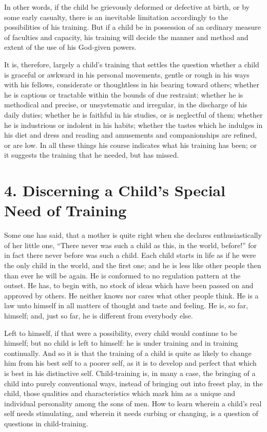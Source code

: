 \documentclass[
]{book}
\begin{document}
In other words, if the child be grievously deformed or defective at birth, or by some early casualty, there is an inevitable limitation accordingly to the possibilities of his training. But if a child be in possession of an ordinary measure of faculties and capacity, his training will decide the manner and method and extent of the use of his God-given powers.

It is, therefore, largely a child's training that settles the question whether a child is graceful or awkward in his personal movements, gentle or rough in his ways with his fellows, considerate or thoughtless in his bearing toward others; whether he is captious or tractable within the bounds of due restraint; whether he is methodical and precise, or unsystematic and irregular, in the discharge of his daily duties; whether he is faithful in his studies, or is neglectful of them; whether he is industrious or indolent in his habits; whether the tastes which he indulges in his diet and dress and reading and amusements and companionships are refined, or are low. In all these things his course indicates what his training has been; or it suggests the training that he needed, but has missed.

\hypertarget{discerning-a-childs-special-need-of-training}{%
\chapter{4. Discerning a Child's Special Need of Training}\label{discerning-a-childs-special-need-of-training}}

Some one has said, that a mother is quite right when she declares enthusiastically of her little one, ``There never was such a child as this, in the world, before!'' for in fact there never before was such a child. Each child starts in life as if he were the only child in the world, and the first one; and he is less like other people then than ever he will be again. He is conformed to no regulation pattern at the outset. He has, to begin with, no stock of ideas which have been passed on and approved by others. He neither knows nor cares what other people think. He is a law unto himself in all matters of thought and taste and feeling. He is, so far, himself; and, just so far, he is different from everybody else.

Left to himself, if that were a possibility, every child would continue to be himself; but no child is left to himself: he is under training and in training continually. And so it is that the training of a child is quite as likely to change him from his best self to a poorer self, as it is to develop and perfect that which is best in his distinctive self. Child-training is, in many a case, the bringing of a child into purely conventional ways, instead of bringing out into freest play, in the child, those qualities and characteristics which mark him as a unique and individual personality among the sons of men. How to learn wherein a child's real self needs stimulating, and wherein it needs curbing or changing, is a question of questions in child-training.
\end{document}
